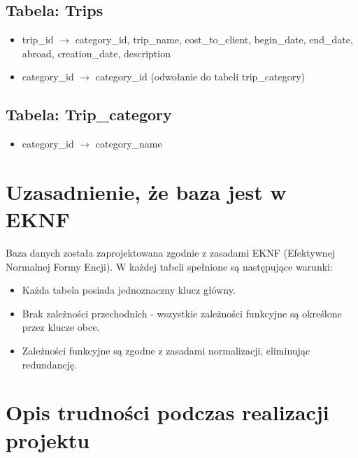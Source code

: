 \documentclass{article}
\begin{document}
\subsection{Tabela: Trips}
\begin{itemize}
    \item trip\_id $\rightarrow$ category\_id, trip\_name, cost\_to\_client, begin\_date, end\_date, abroad, creation\_date, description
    \item category\_id $\rightarrow$ category\_id (odwołanie do tabeli trip\_category)
\end{itemize}
\subsection{Tabela: Trip\_category}
\begin{itemize}
    \item category\_id $\rightarrow$ category\_name
\end{itemize}

\newpage

\section{Uzasadnienie, że baza jest w EKNF}
Baza danych została zaprojektowana zgodnie z zasadami EKNF (Efektywnej Normalnej Formy Encji). W każdej tabeli spełnione są następujące warunki:
\begin{itemize}
    \item Każda tabela posiada jednoznaczny klucz główny.
    \item Brak zależności przechodnich - wszystkie zależności funkcyjne są określone przez klucze obce.
    \item Zależności funkcyjne są zgodne z zasadami normalizacji, eliminując redundancję.
\end{itemize}

\section{Opis trudności podczas realizacji projektu}
\end{document}
